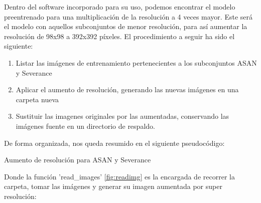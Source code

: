 Dentro del software incorporado para su uso, podemos encontrar el modelo preentrenado para una multiplicación de la resolución a 4 veces mayor. Este será el modelo con aquellos subconjuntos de menor resolución, para así aumentar la resolución de 98x98 a 392x392 píxeles. El procedimiento a seguir ha sido el siguiente:

\begin{enumerate}
	\item Listar las imágenes de entrenamiento pertenecientes a los subconjuntos ASAN y Severance
	\item Aplicar el aumento de resolución, generando las nuevas imágenes en una carpeta nueva
	\item Sustituir las imagenes originales por las aumentadas, conservando las imágenes fuente en un directorio de respaldo.
\end{enumerate}

De forma organizada, nos queda resumido en  el siguiente pseudocódigo:

\begin{algorithm}[H]
	\label{fig:escalar}
	\caption{ Aumento de resolución para ASAN y Severance}
	\begin{algorithmic}
				\State {}
				
				\State {}
				\State {}
		\EndIf
		\EndProcedure
		
	\end{algorithmic}
\end{algorithm}

Donde la función 'read\_images' \ref{fig:readimg} es la encargada de recorrer la carpeta, tomar las imágenes y generar su imagen aumentada por super resolución:

